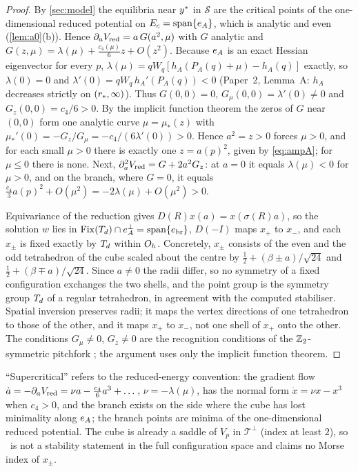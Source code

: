 \begin{proof}
By \cref{sec:model} the equilibria near $y^{*}$ in $\mathcal S$ are the critical points of the one-dimensional
reduced potential on $E_c=\operatorname{span}\{e_{A}\}$, which is analytic and even (\cref{lem:a0}(b)). Hence
$\partial_aV_{\mathrm{red}}=a\,G(a^2,\mu)$ with $G$ analytic and $G(z,\mu)=\lambda(\mu)+\frac{c_4(\mu)}{6}z+O(z^2)$. Because $e_{A}$
is an exact Hessian eigenvector for every $p$, $\lambda(\mu)=qW_q[h_A(P_A(q)+\mu)-h_A(q)]$ exactly, so $\lambda(0)=0$
and $\lambda'(0)=qW_q\,h_A'(P_A(q))<0$ (Paper~2, Lemma~A: $h_A$ decreases strictly on $(r_{*},\infty)$). Thus
$G(0,0)=0$, $G_\mu(0,0)=\lambda'(0)\ne0$ and $G_z(0,0)=c_4/6>0$. By the implicit function theorem the zeros of $G$ near
$(0,0)$ form one analytic curve $\mu=\mu_*(z)$ with $\mu_*'(0)=-G_z/G_\mu=-c_4/(6\lambda'(0))>0$. Hence $a^2=z>0$ forces
$\mu>0$, and for each small $\mu>0$ there is exactly one $z=a(p)^2$, given by \eqref{eq:ampA}; for $\mu\le0$ there is
none. Next, $\partial_a^2V_{\mathrm{red}}=G+2a^2G_z$: at $a=0$ it equals $\lambda(\mu)<0$ for $\mu>0$, and on the branch, where
$G=0$, it equals $\frac{c_4}{3}a(p)^2+O(\mu^2)=-2\lambda(\mu)+O(\mu^2)>0$.

Equivariance of the reduction gives $D(R)x(a)=x(\sigma(R)a)$, so the solution $w$ lies in $\operatorname{Fix}(T_{d})\cap e_{A}^\perp=
\operatorname{span}\{e_{\mathrm{br}}\}$, $D(-I)$ maps $x_+$ to $x_-$, and each $x_\pm$ is fixed exactly by $T_{d}$ within $O_{h}$. Concretely, $x_\pm$
consists of the even and the odd tetrahedron of the cube scaled about the centre by
$\frac12+(\beta\pm a)/\sqrt{24}$ and $\frac12+(\beta\mp a)/\sqrt{24}$. Since $a\ne0$ the radii differ, so no symmetry of
a fixed configuration exchanges the two shells, and the point group is the symmetry group $T_{d}$ of a regular tetrahedron,
in agreement with the computed stabiliser. Spatial inversion preserves radii; it maps the vertex directions of one
tetrahedron to those of the other, and it maps $x_+$ to $x_-$, not one shell of $x_+$ onto the other. The conditions
$G_\mu\ne0$, $G_z\ne0$ are the recognition conditions of the $\mathbb{Z}_2$-symmetric pitchfork \citep{GolubitskySchaeffer1985};
the argument uses only the implicit function theorem.
\end{proof}

\begin{remark}[conventions]\label{rem:supercritical}
``Supercritical'' refers to the reduced-energy convention: the gradient flow $\dot a=-\partial_aV_{\mathrm{red}}=\nu a-\frac{c_4}{6}a^3+\dots$,
$\nu=-\lambda(\mu)$, has the normal form $\dot x=\nu x-x^3$ when $c_4>0$, and the branch exists on the side where the
cube has lost minimality along $e_{A}$; the branch points are minima of the one-dimensional reduced potential. The cube
is already a saddle of $V_p$ in $\mathcal T^\perp$ (index at least $2$), so \thmA\ is not a stability statement in
the full configuration space and claims no Morse index of $x_\pm$.
\end{remark}
